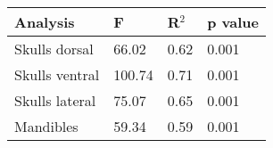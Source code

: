 

\begin{tabular}[t]{l l l l }		
\hline
\textbf{Analysis} & \textbf{F} & R$^2$ & p value \\
\hline
Skulls dorsal & 66.02 & 0.62 & 0.001 \\
Skulls ventral & 100.74 & 0.71 &0.001 \\
Skulls lateral & 75.07 & 0.65 & 0.001 \\
Mandibles & 59.34 & 0.59 & 0.001 \\
\hline
\end{tabular}
